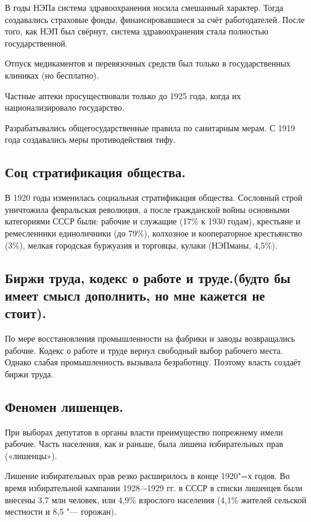  В годы НЭПа система здравоохранения носила смешанный характер. Тогда создавались страховые фонды, финансировавшиеся за счёт работодателей. После того, как НЭП был свёрнут, система здравоохранения стала полностью государственной. 
 
 Отпуск медикаментов и перевязочных средств был только в государственных клиниках (но бесплатно). 
 
 Частные аптеки просуществовали только до 1925 года, когда их национализировало государство. 
 
 Разрабатывались общегосударственные правила по санитарным мерам. С 1919 года создавались меры противодействия тифу.

 \subsection{Соц стратификация общества.}

 В 1920 годы изменилась социальная стратификация общества. Сословный строй уничтожила февральская революция, а после гражданской войны основными категориями СССР были: рабочие и служащие (17\% к 1930 годам), крестьяне и ремесленники единоличники (до 79\%), колхозное и кооператорное крестьянство (3\%), мелкая городская буржуазия и торговцы, кулаки (НЭПманы, 4,5\%).

 \subsection{Биржи труда, кодекс о работе и труде.(будто бы имеет смысл дополнить, но мне кажется не стоит).}

 По мере восстановления промышленности на фабрики и заводы возвращались рабочие. Кодекс о работе и труде вернул свободный выбор рабочего места. Однако слабая промышленность вызывала безработицу. Поэтому власть создаёт биржи труда. 

 \subsection{Феномен лишенцев.}

При выборах депутатов в органы власти преимущество попрежнему имели рабочие. Часть населения, как и раньше, была лишена избирательных прав («лишенцы»).

Лишение избирательных прав резко расширилось в конце 1920"=х годов. Во время избирательной кампании 1928–-1929 гг. в СССР в списки лишенцев были внесены 3,7 млн человек, или 4,9\% взрослого населения (4,1\% жителей сельской местности и 8,5 "--- горожан).

